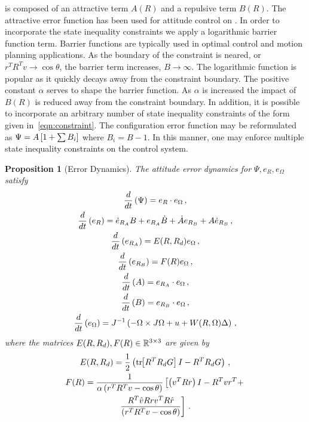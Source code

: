 \documentclass[letterpaper, 10 pt, conference]{ieeeconf}  %
\newtheorem{prop}{Proposition}
\begin{document}
 is composed of an attractive term \( A (R) \) and a repulsive term \( B(R) \).
The attractive error function has been used for attitude control on \SO.
In order to incorporate the state inequality constraints we apply a logarithmic barrier function term.
Barrier functions are typically used in optimal control and motion planning applications.
As the boundary of the constraint is neared, or \( r^T R^T v \to \cos \theta \), the barrier term increases, \( B \to \infty\).
The logarithmic function is popular as it quickly decays away from the constraint boundary.
The positive constant \( \alpha \) serves to shape the barrier function.
As \( \alpha \) is increased the impact of \( B(R) \) is reduced away from the constraint boundary. 
In addition, it is possible to incorporate an arbitrary number of state inequality constraints of the form given in~\cref{eqn:constraint}.
The configuration error function may be reformulated as \( \Psi = A \left[ 1 + \sum B_i \right] \) where \( B_i = B - 1 \).
In this manner, one may enforce multiple state inequality constraints on the control system.

\begin{prop}[Error Dynamics]\label{prop:error_dyn}
	The attitude error dynamics for \( \Psi, e_R, e_\Omega \) satisfy 
	\begin{gather}
		\frac{d }{d t} \left( \Psi \right) = e_R \cdot e_\Omega \, , \label{eqn:psi_dot}\\
		\frac{d }{d t} \left( e_R \right) = \dot{e}_{R_A} B + e_{R_A} \dot{B} + \dot{A}e_{R_B} + A \dot{e}_{R_B} \, , \label{eqn:eR_dot}\\
		\frac{d }{d t} \left( e_{R_A} \right) = E(R, R_d) e_\Omega \, , \label{eqn:eRA_dot} \\
		\frac{d }{d t} \left( e_{R_B} \right) = F(R) e_\Omega \, , \label{eqn:eRB_dot} \\
		\frac{d }{d t} \left( A \right) = e_{R_A} \cdot e_\Omega \, , \label{eqn:A_dot} \\
		\frac{d }{d t} \left( B \right) = e_{R_B} \cdot e_\Omega \, , \label{eqn:B_dot} \\
		\frac{d }{d t} \left( e_\Omega \right) = J^{-1} \left( -\Omega \times J \Omega + u + W(R, \Omega) \Delta \right) \, , \label{eqn:eW_dot}
	\end{gather}
	where the matrices \(E(R,R_d), F(R) \in \mathbb{R}^{3\times3} \) are given by
	\begin{gather}
		E(R,R_d) = \frac{1}{2} \left( \mathrm{tr}\negthickspace\left[ R^T R_d G \right]I - R^T R_d G \right) \, , \label{eqn:E} \\
		F(R) = \frac{1}{\alpha \left( r^T R^T v - \cos \theta \right)} \left[\left( v^T R r \right) I - R^T v r^T + \right. \nonumber \\
		\left. \frac{R^T \hat{v} R r v^T R \hat{r}}{\left( r^T R^T v - \cos \theta \right)}\right] \, . \label{eqn:F}
	\end{gather}
\end{prop}
\end{document}
